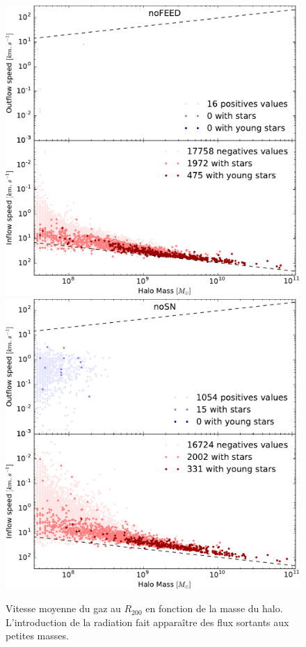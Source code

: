 \begin{figure}
	\centering
	\includegraphics[width=.95\linewidth]{img/03/flux_speed_noFEED.pdf} 
	\includegraphics[width=.95\linewidth]{img/03/flux_speed_noSN.pdf} 
    \caption[Vitesse du gaz au $R_{200}$ 1]{Vitesse moyenne du gaz au $R_{200}$ en fonction de la masse du halo. L'introduction de la radiation fait apparaître des flux sortants aux petites masses.}
 	\label{fig:R200speed1}
\end{figure}

